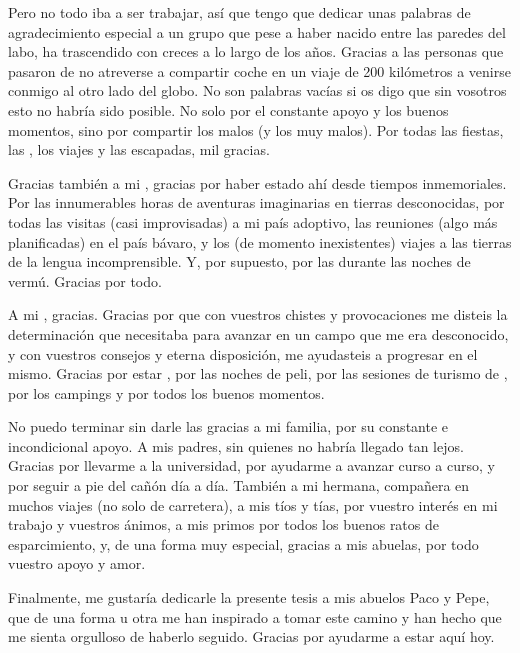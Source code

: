 \begin{itshape}
    \bigskip
    
    Pero no todo iba a ser trabajar, así que tengo que dedicar unas palabras de agradecimiento especial a un grupo que pese a haber nacido entre las paredes del labo, ha trascendido con creces a lo largo de los años. Gracias a las personas que pasaron de no atreverse a compartir coche en un viaje de 200 kilómetros a venirse conmigo al otro lado del globo. No son palabras vacías si os digo que sin vosotros esto no habría sido posible. No solo por el constante apoyo y los buenos momentos, sino por compartir los malos (y los muy malos). Por todas las fiestas, las , los viajes y las escapadas, mil gracias.
    
    Gracias también a mi , gracias por haber estado ahí desde tiempos inmemoriales. Por las innumerables horas de aventuras imaginarias en tierras desconocidas, por todas las visitas (casi improvisadas) a mi país adoptivo, las reuniones (algo más planificadas) en el país bávaro, y los (de momento inexistentes) viajes a las tierras de la lengua incomprensible. Y, por supuesto, por las  durante las noches de vermú. Gracias por todo.
    
    A mi , gracias. Gracias por que con vuestros chistes y provocaciones me disteis la determinación que necesitaba para avanzar en un campo que me era desconocido, y con vuestros consejos y eterna disposición, me ayudasteis a progresar en el mismo. Gracias por estar , por las noches de peli, por las sesiones de turismo de , por los campings y por todos los buenos momentos.

    No puedo terminar sin darle las gracias a mi familia, por su constante e incondicional apoyo. A mis padres, sin quienes no habría llegado tan lejos. Gracias por llevarme a la universidad, por ayudarme a avanzar curso a curso, y por seguir a pie del cañón día a día. También a mi hermana, compañera en muchos viajes (no solo de carretera), a mis tíos y tías, por vuestro interés en mi trabajo y vuestros ánimos, a mis primos por todos los buenos ratos de esparcimiento, y, de una forma muy especial, gracias a mis abuelas, por todo vuestro apoyo y amor.

    \bigskip

    Finalmente, me gustaría dedicarle la presente tesis a mis abuelos Paco y Pepe, que de una forma u otra me han inspirado a tomar este camino y han hecho que me sienta orgulloso de haberlo seguido. Gracias por ayudarme a estar aquí hoy.

\end{itshape}
